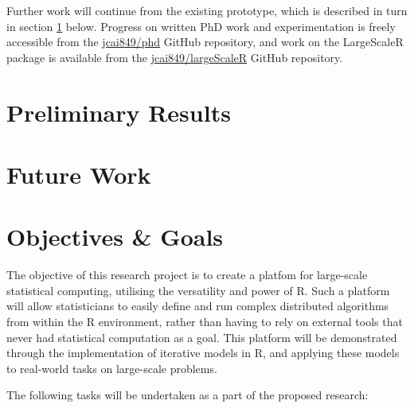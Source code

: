 \documentclass[a4paper,10pt]{article}
\begin{document}
Further work will continue from the existing prototype, which is described in turn in section \ref{curr} below.
Progress on written PhD work and experimentation is freely accessible from the \href{https://github.com/jcai849/phd}{jcai849/phd} GitHub repository, and work on the LargeScaleR package is available from the \href{https://github.com/jcai849/phd}{jcai849/largeScaleR} GitHub repository. 

\section{Preliminary Results}\label{curr}



\section{Future Work}\label{future}


\section{Objectives \& Goals}\label{goals}

The objective of this research project is to create a platfom for large-scale statistical computing, utilising the versatility and power of R.
Such a platform will allow statisticians to easily define and run complex distributed algorithms from within the R environment, rather than having to rely on external tools that never had statistical computation as a goal.
This platform will be demonstrated through the implementation of iterative models in R, and applying these models to real-world tasks on large-scale problems.

The following tasks will be undertaken as a part of the proposed research:
\end{document}
